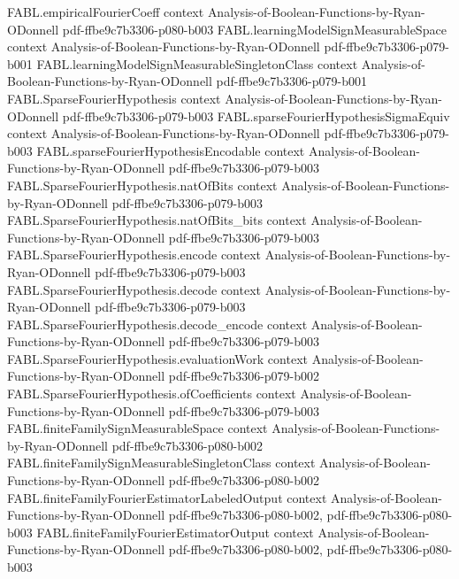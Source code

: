 \begin{theorem}
\proofstep
  {FABL.empiricalFourierCoeff}
  {context}
  {Analysis-of-Boolean-Functions-by-Ryan-ODonnell}
  {pdf-ffbe9c7b3306-p080-b003}
\proofstep
  {FABL.learningModelSignMeasurableSpace}
  {context}
  {Analysis-of-Boolean-Functions-by-Ryan-ODonnell}
  {pdf-ffbe9c7b3306-p079-b001}
\proofstep
  {FABL.learningModelSignMeasurableSingletonClass}
  {context}
  {Analysis-of-Boolean-Functions-by-Ryan-ODonnell}
  {pdf-ffbe9c7b3306-p079-b001}
\proofstep
  {FABL.SparseFourierHypothesis}
  {context}
  {Analysis-of-Boolean-Functions-by-Ryan-ODonnell}
  {pdf-ffbe9c7b3306-p079-b003}
\proofstep
  {FABL.sparseFourierHypothesisSigmaEquiv}
  {context}
  {Analysis-of-Boolean-Functions-by-Ryan-ODonnell}
  {pdf-ffbe9c7b3306-p079-b003}
\proofstep
  {FABL.sparseFourierHypothesisEncodable}
  {context}
  {Analysis-of-Boolean-Functions-by-Ryan-ODonnell}
  {pdf-ffbe9c7b3306-p079-b003}
\proofstep
  {FABL.SparseFourierHypothesis.natOfBits}
  {context}
  {Analysis-of-Boolean-Functions-by-Ryan-ODonnell}
  {pdf-ffbe9c7b3306-p079-b003}
\proofstep
  {FABL.SparseFourierHypothesis.natOfBits_bits}
  {context}
  {Analysis-of-Boolean-Functions-by-Ryan-ODonnell}
  {pdf-ffbe9c7b3306-p079-b003}
\proofstep
  {FABL.SparseFourierHypothesis.encode}
  {context}
  {Analysis-of-Boolean-Functions-by-Ryan-ODonnell}
  {pdf-ffbe9c7b3306-p079-b003}
\proofstep
  {FABL.SparseFourierHypothesis.decode}
  {context}
  {Analysis-of-Boolean-Functions-by-Ryan-ODonnell}
  {pdf-ffbe9c7b3306-p079-b003}
\proofstep
  {FABL.SparseFourierHypothesis.decode_encode}
  {context}
  {Analysis-of-Boolean-Functions-by-Ryan-ODonnell}
  {pdf-ffbe9c7b3306-p079-b003}
\proofstep
  {FABL.SparseFourierHypothesis.evaluationWork}
  {context}
  {Analysis-of-Boolean-Functions-by-Ryan-ODonnell}
  {pdf-ffbe9c7b3306-p079-b002}
\proofstep
  {FABL.SparseFourierHypothesis.ofCoefficients}
  {context}
  {Analysis-of-Boolean-Functions-by-Ryan-ODonnell}
  {pdf-ffbe9c7b3306-p079-b003}
\proofstep
  {FABL.finiteFamilySignMeasurableSpace}
  {context}
  {Analysis-of-Boolean-Functions-by-Ryan-ODonnell}
  {pdf-ffbe9c7b3306-p080-b002}
\proofstep
  {FABL.finiteFamilySignMeasurableSingletonClass}
  {context}
  {Analysis-of-Boolean-Functions-by-Ryan-ODonnell}
  {pdf-ffbe9c7b3306-p080-b002}
\proofstep
  {FABL.finiteFamilyFourierEstimatorLabeledOutput}
  {context}
  {Analysis-of-Boolean-Functions-by-Ryan-ODonnell}
  {pdf-ffbe9c7b3306-p080-b002,
    pdf-ffbe9c7b3306-p080-b003}
\proofstep
  {FABL.finiteFamilyFourierEstimatorOutput}
  {context}
  {Analysis-of-Boolean-Functions-by-Ryan-ODonnell}
  {pdf-ffbe9c7b3306-p080-b002,
    pdf-ffbe9c7b3306-p080-b003}
\proofstep

\end{theorem}
